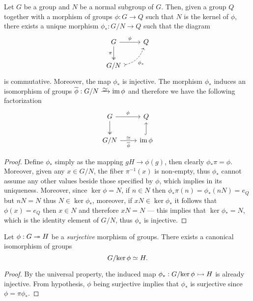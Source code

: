 \begin{proposition}
\label{prop:universal-property-quotients-grp}
Let \(G\) be a group and \(N\) be a normal subgroup of \(G\). Then, given a
group \(Q\) together with a morphism of groups \(\phi: G \to Q\) such that
\(N\) is the kernel of \(\phi\), there exists a unique morphism
\(\phi_{*}: G/N \to Q\) such that the diagram
\[
  \begin{tikzcd}
    G \ar[d, two heads, swap, "\pi"] \ar[r, "\phi"] &Q \\
    G/N \ar[ur, dashed, swap, bend right, tail, "\phi_{*}"] &
  \end{tikzcd}
\]
is commutative. Moreover, the map \(\phi_*\) is injective. The morphism
\(\phi_{*}\) induces an isomorphism of groups
\(\overline{\phi}: G/N \isoto \im \phi\) and therefore we have the following
factorization
\[
  \begin{tikzcd}
  G \ar[d, two heads] \ar[r, "\phi"] &Q \\
  G/N \ar[r, "\overline{\phi}"', "\dis"]
  &\im \phi \ar[u, hook]
  \end{tikzcd}
\]
\end{proposition}

\begin{proof}
Define \(\phi_{*}\) simply as the mapping \(gH \to \phi(g)\), then clearly
\(\phi_{*} \pi = \phi\). Moreover, given any \(x \in G/N\), the fiber
\(\pi^{-1}(x)\) is non-empty, thus \(\phi_{*}\) cannot assume any other values
beside those specified by \(\phi\), which implies in its uniqueness. Moreover,
since \(\ker \phi = N\), if \(n \in N\) then
\(\phi_{*} \pi(n) = \phi_{*}(n N) = e_{Q}\) but \(n N = N\) thus
\(N \in \ker \phi_{*}\), moreover, if \(x N \in \ker \phi_{*}\) it follows that
\(\phi(x) = e_Q\) then \(x \in N\) and therefore \(x N = N\) --- this implies
that \(\ker \phi_{*} = N\), which is the identity element of \(G/N\), thus
\(\phi_{*}\) is injective.
\end{proof}

\begin{corollary}
\label{cor:first-iso-grp}
Let \(\phi: G \twoheadrightarrow H\) be a \emph{surjective} morphism of groups. There exists a
canonical isomorphism of groups
\[
G/{\ker \phi} \simeq H.
\]
\end{corollary}

\begin{proof}
By the universal property, the induced map \(\phi_{*}: G/{\ker \phi} \rightarrowtail H\)
is already injective. From hypothesis, \(\phi\) being surjective implies that
\(\phi_{*}\) is surjective since \(\phi = \pi \phi_{*}\).
\end{proof}

